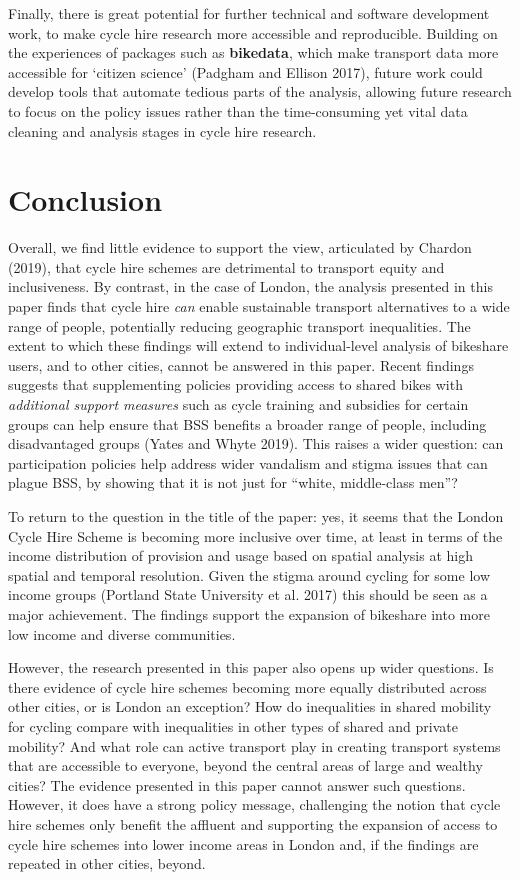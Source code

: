 \documentclass[
]{article}
\begin{document}
Finally, there is great potential for further technical and software development work, to make cycle hire research more accessible and reproducible.
Building on the experiences of packages such as \textbf{bikedata}, which make transport data more accessible for `citizen science' (Padgham and Ellison 2017), future work could develop tools that automate tedious parts of the analysis, allowing future research to focus on the policy issues rather than the time-consuming yet vital data cleaning and analysis stages in cycle hire research.

\hypertarget{conclusion}{%
\section{Conclusion}\label{conclusion}}

Overall, we find little evidence to support the view, articulated by Chardon (2019), that cycle hire schemes are detrimental to transport equity and inclusiveness.
By contrast, in the case of London, the analysis presented in this paper finds that cycle hire \emph{can} enable sustainable transport alternatives to a wide range of people, potentially reducing geographic transport inequalities.
The extent to which these findings will extend to individual-level analysis of bikeshare users, and to other cities, cannot be answered in this paper.
Recent findings suggests that supplementing policies providing access to shared bikes with \emph{additional support measures} such as cycle training and subsidies for certain groups can help ensure that BSS benefits a broader range of people, including disadvantaged groups (Yates and Whyte 2019).
This raises a wider question: can participation policies help address wider vandalism and stigma issues that can plague BSS, by showing that it is not just for ``white, middle-class men''?

To return to the question in the title of the paper: yes, it seems that the London Cycle Hire Scheme is becoming more inclusive over time, at least in terms of the income distribution of provision and usage based on spatial analysis at high spatial and temporal resolution.
Given the stigma around cycling for some low income groups (Portland State University et al. 2017) this should be seen as a major achievement.
The findings support the expansion of bikeshare into more low income and diverse communities.

However, the research presented in this paper also opens up wider questions.
Is there evidence of cycle hire schemes becoming more equally distributed across other cities, or is London an exception?
How do inequalities in shared mobility for cycling compare with inequalities in other types of shared and private mobility?
And what role can active transport play in creating transport systems that are accessible to everyone, beyond the central areas of large and wealthy cities?
The evidence presented in this paper cannot answer such questions.
However, it does have a strong policy message, challenging the notion that cycle hire schemes only benefit the affluent and supporting the expansion of access to cycle hire schemes into lower income areas in London and, if the findings are repeated in other cities, beyond.
\end{document}
